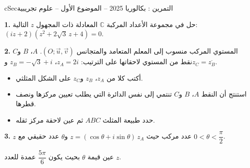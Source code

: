 \documentclass[12pt,a4paper]{article}
\newenvironment{BOX}[2]{\begin{otherlanguage}{english}\begin{arbox}{#1}{#2}}{\end{arbox}\end{otherlanguage}}
\newcounter{exo}
\newenvironment{tamrin}[1]{\stepcounter{exo}\begin{BOX}{cSec}{التمرين \theexo: #1}}{\end{BOX}}
\newenvironment{sq}{\begin{itemize}[leftmargin=2.4em,itemsep=3pt]}{\end{itemize}}
\newcommand{\qa}{\item[(أ)]}\newcommand{\qb}{\item[(ب)]}\newcommand{\qc}{\item[(جـ)]}\newcommand{\qd}{\item[(د)]}\newcommand{\qe}{\item[(هـ)]}
\newcommand{\QQ}[1]{\par\smallskip\textbf{#1.} }
\begin{document}
\begin{tamrin}{بكالوريا 2025 -- الموضوع الأول -- علوم تجريبية}
\QQ{1} حل في مجموعة الأعداد المركبة $\mathbb{C}$ المعادلة ذات المجهول $z$ التالية: $(iz+2)\left(z^2+2\sqrt3\,z+4\right)=0$.
\QQ{2} المستوي المركب منسوب إلى المعلم المتعامد والمتجانس $(O;\vec u,\vec v)$. $A$، $B$ و$C$ نقط من المستوي لاحقاتها على الترتيب: $z_A=2i$، $z_B=-\sqrt3+i$ و$z_C=\overline{z_B}$.
\begin{sq}
\qa أكتب كلا من $z_A$، $z_B$ و$z_C$ على الشكل المثلثي.
\qb استنتج أن النقط $A$، $B$ و$C$ تنتمي إلى نفس الدائرة التي يطلب تعيين مركزها ونصف قطرها.
\qc حدد طبيعة المثلث $ABC$ ثم عين لاحقة مركز ثقله.
\end{sq}
\QQ{3} $z$ عدد مركب حيث $z=(\cos\theta+i\sin\theta)\,z_A$ و$\theta$ عدد حقيقي مع $0<\theta<\dfrac{\pi}{2}$.

عين قيمة $\theta$ بحيث يكون $\dfrac{5\pi}{6}$ عمدة للعدد $z$.
\end{tamrin}
\end{document}
